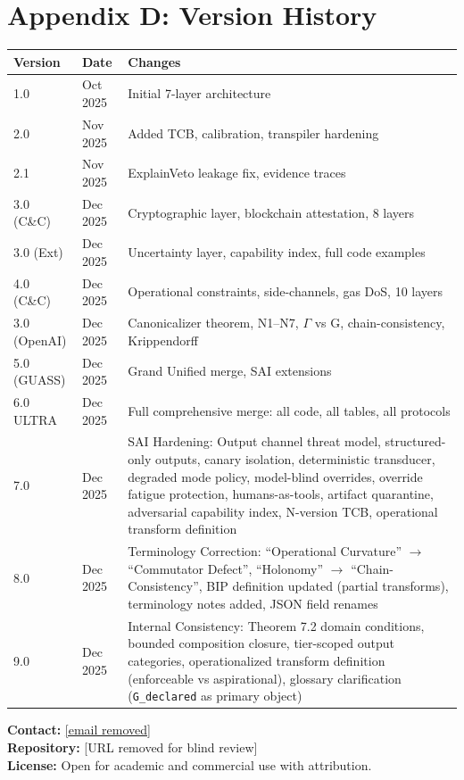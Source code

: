 \documentclass[11pt,letterpaper]{article}
\theoremstyle{definition}
\theoremstyle{remark}
\begin{document}
\section*{Appendix D: Version History}

\begin{longtable}{@{}llp{9cm}@{}}
\toprule
\textbf{Version} & \textbf{Date} & \textbf{Changes} \\
\midrule
\endhead
1.0 & Oct 2025 & Initial 7-layer architecture \\
2.0 & Nov 2025 & Added TCB, calibration, transpiler hardening \\
2.1 & Nov 2025 & ExplainVeto leakage fix, evidence traces \\
3.0 (C\&C) & Dec 2025 & Cryptographic layer, blockchain attestation, 8 layers \\
3.0 (Ext) & Dec 2025 & Uncertainty layer, capability index, full code examples \\
4.0 (C\&C) & Dec 2025 & Operational constraints, side-channels, gas DoS, 10 layers \\
3.0 (OpenAI) & Dec 2025 & Canonicalizer theorem, N1--N7, $\Gamma$ vs G, chain-consistency, Krippendorff \\
5.0 (GUASS) & Dec 2025 & Grand Unified merge, SAI extensions \\
6.0 ULTRA & Dec 2025 & Full comprehensive merge: all code, all tables, all protocols \\
7.0 & Dec 2025 & SAI Hardening: Output channel threat model, structured-only outputs, canary isolation, deterministic transducer, degraded mode policy, model-blind overrides, override fatigue protection, humans-as-tools, artifact quarantine, adversarial capability index, N-version TCB, operational transform definition \\
8.0 & Dec 2025 & Terminology Correction: ``Operational Curvature'' $\to$ ``Commutator Defect'', ``Holonomy'' $\to$ ``Chain-Consistency'', BIP definition updated (partial transforms), terminology notes added, JSON field renames \\
9.0 & Dec 2025 & Internal Consistency: Theorem 7.2 domain conditions, bounded composition closure, tier-scoped output categories, operationalized transform definition (enforceable vs aspirational), glossary clarification (\texttt{G\_declared} as primary object) \\
\bottomrule
\end{longtable}

\medskip
\noindent\textbf{Contact:} \href{mailto:[email removed]}{[email removed]}\\
\textbf{Repository:} [URL removed for blind review]\\
\textbf{License:} Open for academic and commercial use with attribution.
\end{document}
